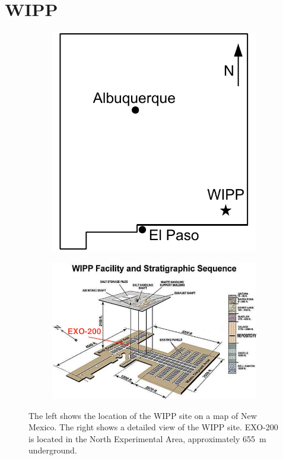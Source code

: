 \documentclass[herrin-thesis.tex]{subfiles}
\begin{document}
\section{WIPP}

\begin{figure}[htb]
\centering
\begin{subfigure}[c]{0.30\linewidth}
\includegraphics[width=\textwidth]{./figures/wipp_map.pdf}
\end{subfigure}\hspace{0.05\linewidth}\hfill%
\begin{subfigure}[c]{0.60\linewidth}
\includegraphics[width=\textwidth]{./photos/wipp_site_annotated.png}
\end{subfigure}
\caption[The WIPP Site]{The left shows the location of the WIPP site on a map of New Mexico. The right shows a detailed view of the WIPP site. EXO-200 is located in the North Experimental Area, approximately \SI{655}{\m} underground.}
\label{fig:detector_wipp}
\end{figure}
\end{document}
